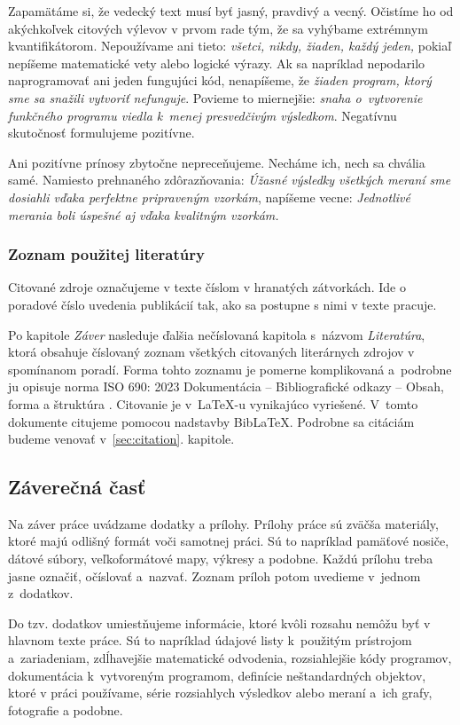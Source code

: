 Zapamätáme si, že vedecký text musí byť jasný, pravdivý a vecný. 
Očistíme ho od akýchkoľvek citových výlevov v prvom rade tým,
že sa vyhýbame extrémnym kvantifikátorom. Nepoužívame ani tieto: 
\emph{všetci, nikdy, žiaden, každý jeden,}
pokiaľ nepíšeme matematické vety alebo logické výrazy.
Ak sa napríklad nepodarilo naprogramovať ani jeden fungujúci kód, 
nenapíšeme,
že \emph{žiaden program, ktorý sme sa snažili vytvoriť nefunguje}.
Povieme to miernejšie: \emph{snaha o~vytvorenie funkčného 
programu viedla k~menej presvedčivým výsledkom}.
Negatívnu skutočnosť formulujeme pozitívne. 

Ani pozitívne prínosy zbytočne nepreceňujeme.
Necháme ich, nech sa chvália samé.
Namiesto prehnaného zdôrazňovania:
\emph{Úžasné výsledky všetkých meraní sme dosiahli
vďaka perfektne pripraveným vzorkám},
napíšeme vecne:
\emph{Jednotlivé merania boli úspešné aj
vďaka kvalitným vzorkám.}

\subsubsection{Zoznam použitej literatúry}
Citované zdroje označujeme v texte číslom v hranatých zátvorkách. Ide o poradové číslo uvedenia publikácií tak, ako sa postupne s nimi v texte pracuje.

Po kapitole \emph{Záver} nasleduje ďalšia nečíslovaná kapitola
s~názvom \emph{Literatúra},
ktorá obsahuje číslovaný zoznam všetkých
citovaných literárnych zdrojov v spomínanom poradí.
Forma tohto zoznamu je pomerne komplikovaná a~podrobne
ju opisuje norma ISO 690: 2023 Dokumentácia -- Bibliografické odkazy -- Obsah, forma a štruktúra \cite{iso690}.
Citovanie je v~\LaTeX-u vynikajúco vyriešené.
V~tomto dokumente citujeme pomocou nadstavby Bib\LaTeX.
Podrobne sa citáciám budeme venovať v~\ref{sec:citation}. kapitole.

\subsection{Záverečná časť}
Na záver práce uvádzame dodatky a prílohy.
Prílohy práce sú zväčša materiály,
ktoré majú odlišný formát voči samotnej práci.
Sú to napríklad pamäťové nosiče,
dátové súbory, veľkoformátové mapy, výkresy a podobne.
Každú prílohu treba jasne označiť, očíslovať a~nazvať.
Zoznam príloh potom uvedieme v~jednom z~dodatkov.

Do tzv. dodatkov umiestňujeme informácie,
ktoré kvôli rozsahu nemôžu byť v hlavnom texte práce.
Sú to napríklad údajové listy k~použitým prístrojom
a~zariadeniam, zdĺhavejšie matematické odvodenia,
rozsiahlejšie kódy programov, dokumentácia
k~vytvoreným programom, definície neštandardných objektov,
ktoré v práci používame,
série rozsiahlych výsledkov alebo meraní
a~ich grafy, fotografie a podobne.

